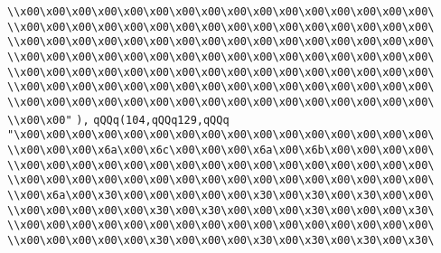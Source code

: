 \verb|\\x00\x00\x00\x00\x00\x00\x00\x00\x00\x00\x00\x00\x00\x00\x00\x00\|\newline
\verb|\\x00\x00\x00\x00\x00\x00\x00\x00\x00\x00\x00\x00\x00\x00\x00\x00\|\newline
\verb|\\x00\x00\x00\x00\x00\x00\x00\x00\x00\x00\x00\x00\x00\x00\x00\x00\|\newline
\verb|\\x00\x00\x00\x00\x00\x00\x00\x00\x00\x00\x00\x00\x00\x00\x00\x00\|\newline
\verb|\\x00\x00\x00\x00\x00\x00\x00\x00\x00\x00\x00\x00\x00\x00\x00\x00\|\newline
\verb|\\x00\x00\x00\x00\x00\x00\x00\x00\x00\x00\x00\x00\x00\x00\x00\x00\|\newline
\verb|\\x00\x00\x00\x00\x00\x00\x00\x00\x00\x00\x00\x00\x00\x00\x00\x00\|\newline
\verb|\\x00\x00"|\newline
\verb|),|\newline
\verb|qQQq(104,qQQq129,qQQq|\newline
\verb|"\x00\x00\x00\x00\x00\x00\x00\x00\x00\x00\x00\x00\x00\x00\x00\x00\|\newline
\verb|\\x00\x00\x00\x6a\x00\x6c\x00\x00\x00\x6a\x00\x6b\x00\x00\x00\x00\|\newline
\verb|\\x00\x00\x00\x00\x00\x00\x00\x00\x00\x00\x00\x00\x00\x00\x00\x00\|\newline
\verb|\\x00\x00\x00\x00\x00\x00\x00\x00\x00\x00\x00\x00\x00\x00\x00\x00\|\newline
\verb|\\x00\x6a\x00\x30\x00\x00\x00\x00\x00\x30\x00\x30\x00\x30\x00\x00\|\newline
\verb|\\x00\x00\x00\x00\x00\x30\x00\x30\x00\x00\x00\x30\x00\x00\x00\x30\|\newline
\verb|\\x00\x00\x00\x00\x00\x00\x00\x00\x00\x00\x00\x00\x00\x00\x00\x00\|\newline
\verb|\\x00\x00\x00\x00\x00\x30\x00\x00\x00\x30\x00\x30\x00\x30\x00\x30\|\newline
